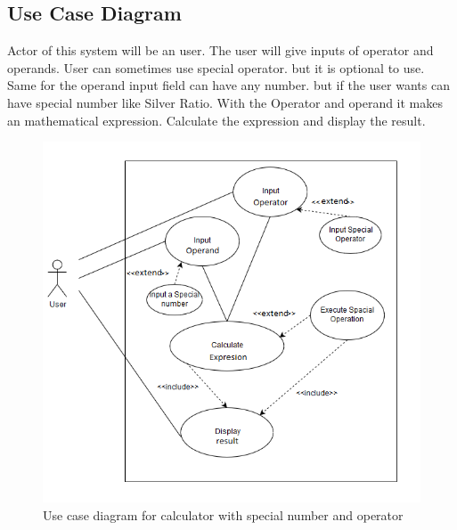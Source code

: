 \documentclass{article}
\begin{document}
\subsection{Use Case Diagram}
Actor of this system will be an user. The user will give inputs of operator and operands. User can sometimes use special operator. but it is optional to use. Same for the operand input field can have any number. but if the user wants can have special number like Silver Ratio. With the Operator and operand it makes an mathematical expression. Calculate the expression and display the result. 
\begin{figure}[htb!]
  
  \includegraphics[width=1\textwidth]{usecase}
  \centering
  \caption{Use case diagram for calculator with special number and operator}
\end{figure}
\end{document}
